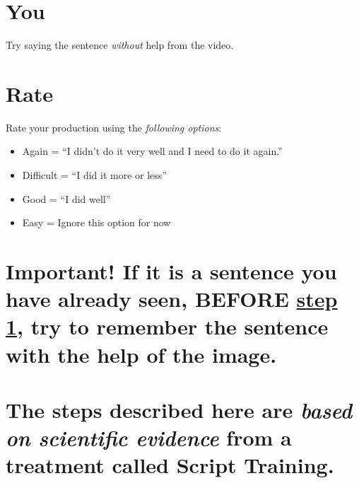 \documentclass[
]{book}
\begin{document}
\hypertarget{you}{%
\section{You}\label{you}}

Try saying the sentence \emph{without} help from the video.

\hypertarget{rate}{%
\section{Rate}\label{rate}}

Rate your production using the \emph{following options}:

\begin{itemize}
\item
  Again = ``I didn't do it very well and I need to do it again.''
\item
  Difficult = ``I did it more or less''
\item
  Good = ``I did well''
\item
  Easy = Ignore this option for now
\end{itemize}

\hypertarget{important-if-it-is-a-sentence-you-have-already-seen-before-step-1-try-to-remember-the-sentence-with-the-help-of-the-image.}{%
\section{\texorpdfstring{Important! If it is a sentence you have \textbf{already} seen, BEFORE \protect\hyperlink{cross_6}{step 1}, try to remember the sentence with the help of the image.}{Important! If it is a sentence you have already seen, BEFORE step 1, try to remember the sentence with the help of the image.}}\label{important-if-it-is-a-sentence-you-have-already-seen-before-step-1-try-to-remember-the-sentence-with-the-help-of-the-image.}}

\hypertarget{the-steps-described-here-are-based-on-scientific-evidence-from-a-treatment-called-script-training.}{%
\section{\texorpdfstring{The steps described here are \emph{based on scientific evidence} from a treatment called Script Training.}{The steps described here are based on scientific evidence from a treatment called Script Training.}}\label{the-steps-described-here-are-based-on-scientific-evidence-from-a-treatment-called-script-training.}}

  
\end{document}
